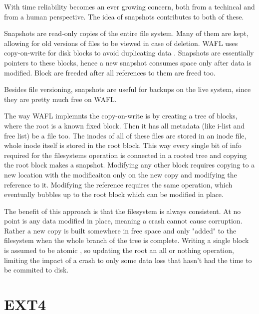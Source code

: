             With time reliability becomes an ever growing concern, both from a
            techincal and from a human perspective. The idea of snapshots
            contributes to both of these.

            Snapshots are read-only copies of the entire file system. Many of
            them are kept, allowing for old versions of files to be viewed in
            case of deletion. WAFL uses copy-on-write for disk blocks to avoid
            duplicating data \cite{WAFL}. Snapshots are essentially pointers to
            these blocks, hence a new snapshot consumes space only after data
            is modified. Block are freeded after all references to them are
            freed too.

            Besides file versioning, snapshots are useful for backups on the
            live system, since they are pretty much free on WAFL.


            The way WAFL implemnts the copy-on-write is by creating a tree of
            blocks, where the root is a known fixed block. Then it has all
            metadata (like i-list and free list) be a file too. The inodes of
            all of these files are stored in an inode file, whole inode itself
            is stored in the root block. This way every single bit of info
            required for the filesystems operation is connected in a rooted
            tree and copying the root block makes a snapshot. Modifying any
            other block requires copying to a new location with the
            modificaiton only on the new copy and modifying the reference to
            it. Modifying the reference requires the same operation, which
            eventually bubbles up to the root block which can be modified in
            place.

            The benefit of this approach is that the filesystem is always
            consistent. At no point is any data modified in place, meaning a
            crash cannot cause corruption. Rather a new copy is built somewhere
            in free space and only "added" to the filesystem when the whole
            branch of the tree is complete. Writing a single block is assumed
            to be atomic \cite{???}, so updating the root an all or nothing
            operation, limiting the impact of a crash to only some data loss
            that hasn't had the time to be commited to disk.

    \section{EXT4}

